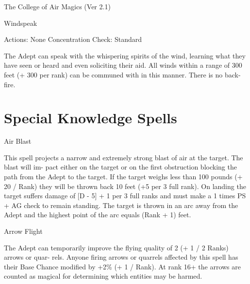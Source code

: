\begin{Chapter}{The College of Air Magics (Ver 2.1)}
\begin{ritual}[Q-1]{Windspeak }

Actions: None 
Concentration Check: Standard 

\begin{effects}
 The  Adept  can  speak  with  the  whispering 
spirits of the wind, learning what they have seen or 
heard  and  even  soliciting  their  aid.  All  winds 
within a range of 300 feet (+ 300 per rank) can be 
communed  with in this  manner.  There  is  no  back-
fire. 


\end{effects}
\end{ritual}

\section{Special Knowledge Spells}

\begin{spell}[S-1]{Air Blast }

\begin{effects}
This spell projects a narrow and extremely 
strong  blast  of  air  at  the  target.  The  blast  will  im-
pact  either  on the  target  or  on the  first  obstruction 
blocking  the  path  from  the  Adept  to  the  target.  If 
the  target  weighs  less  than  100  pounds  (+  20  / 
Rank)  they  will  be  thrown  back  10  feet  (+5  per  3 
full rank). On landing the target suffers damage of 
[D  -  5]  +  1  per  3  full  ranks  and  must  make  a  1 
times  PS  +  AG  check  to  remain  standing.  The 
target is thrown in an arc away from the Adept and 
the highest point of the arc equals (Rank + 1) feet. 

\end{effects}
\end{spell}

\begin{spell}[S-2]{Arrow Flight }

\begin{effects}
 The  Adept  can  temporarily  improve  the 
flying quality of 2 (+ 1 / 2 Ranks) arrows or quar-
rels.  Anyone  firing  arrows  or  quarrels  affected  by 
this  spell  has  their Base  Chance  modified by  +2\% 
(+ 1 / Rank). At rank 16+ the arrows are counted as 
magical  for  determining  which  entities  may  be 
harmed. 


\end{effects}
\end{spell}
\end{Chapter}
